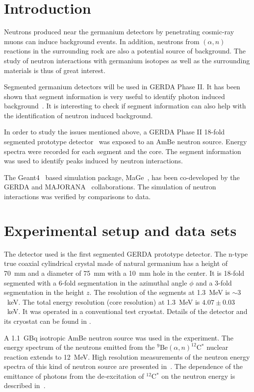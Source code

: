 
\section{Introduction}
\label{sec:neu:intro}
Neutrons produced near the germanium detectors by penetrating cosmic-ray muons can induce background events. In addition, neutrons from $(\alpha, n)$ reactions in the surrounding rock are also a potential source of background. The study of neutron interactions with germanium isotopes as well as the surrounding materials is thus of great interest.

Segmented germanium detectors will be used in GERDA Phase II. It has been shown that segment information is very useful to identify photon induced background~\cite{Pid07}. It is interesting to check if segment information can also help with the identification of neutron induced background.

In order to study the issues mentioned above, a GERDA Phase II 18-fold segmented prototype detector~\cite{Sie07} was exposed to an AmBe neutron source. Energy spectra were recorded for each segment and the core. The segment information was used to identify peaks induced by neutron interactions.

The Geant4~\cite{Gea03,Gea06} based simulation package, MaGe~\cite{Mag06, Mag08}, has been co-developed by the GERDA and MAJORANA~\cite{Gai03, Aal04} collaborations. The simulation of neutron interactions was verified by comparisons to data.

\section{Experimental setup and data sets}
\label{sec:neu:exp}
The detector used is the first segmented GERDA prototype detector. The
n-type true coaxial cylindrical crystal made of natural germanium has
a height of 70~mm and a diameter of 75~mm with a 10~mm hole in the
center. It is 18-fold segmented with a 6-fold segmentation in the
azimuthal angle $\phi$ and a 3-fold segmentation in the height $z$.
The resolution of the segments at 1.3~MeV is $\sim3$~keV. The total
energy resolution (core resolution) at 1.3~MeV is $4.07 \pm 0.03$~keV.
It was operated in a conventional test cryostat. Details of the
detector and its cryostat can be found in \cite{Sie07}.

A 1.1~GBq isotropic AmBe neutron source was used in the experiment.
The energy spectrum of the neutrons emitted from the
$^{9}$Be$(\alpha,n)^{12}$C$^{*}$ nuclear reaction extends to 12~MeV.
High resolution measurements of the neutron energy spectra of this
kind of neutron source are presented in~\cite{Mar95,Gei75}. The
dependence of the emittance of photons from the de-excitation of
$^{12}$C$^{*}$ on the neutron energy is described in~\cite{Gei75}.

